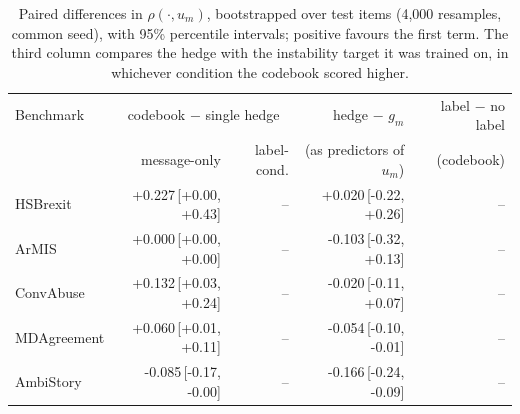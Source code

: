 \begin{table}[t]
\centering
\small
\begin{tabular}{lrrrr}
\hline
Benchmark & \multicolumn{2}{c}{codebook $-$ single hedge} & hedge $-$ $g_m$ & label $-$ no label \\
 & message-only & label-cond. & (as predictors of $u_m$) & (codebook) \\
\hline
HSBrexit & +0.227{\scriptsize\,[+0.00, +0.43]} & -- & +0.020{\scriptsize\,[-0.22, +0.26]} & -- \\
ArMIS & +0.000{\scriptsize\,[+0.00, +0.00]} & -- & -0.103{\scriptsize\,[-0.32, +0.13]} & -- \\
ConvAbuse & +0.132{\scriptsize\,[+0.03, +0.24]} & -- & -0.020{\scriptsize\,[-0.11, +0.07]} & -- \\
MDAgreement & +0.060{\scriptsize\,[+0.01, +0.11]} & -- & -0.054{\scriptsize\,[-0.10, -0.01]} & -- \\
AmbiStory & -0.085{\scriptsize\,[-0.17, -0.00]} & -- & -0.166{\scriptsize\,[-0.24, -0.09]} & -- \\
\hline
\end{tabular}
\caption{Paired differences in $\rho(\cdot,u_m)$, bootstrapped over test items (4,000 resamples, common seed), with 95\% percentile intervals; positive favours the first term. The third column compares the hedge with the instability target it was trained on, in whichever condition the codebook scored higher.}
\label{tab:paired}
\end{table}